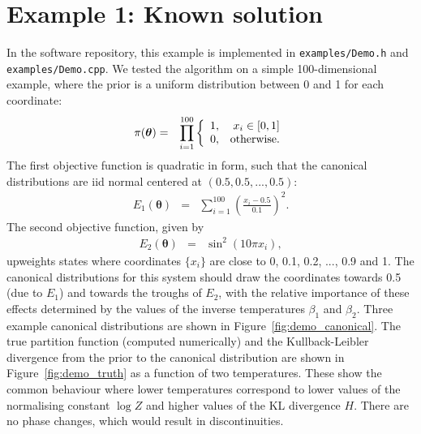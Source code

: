 \documentclass[entropy,article,submit,moreauthors,pdftex,10pt,a4paper]{Definitions/mdpi}
\newcommand{\xx}{\boldsymbol{\theta}}
\begin{document}
\section{Example 1: Known solution}
In the software repository, this example is implemented in
{\tt examples/Demo.h} and {\tt examples/Demo.cpp}.
We tested the algorithm on a simple 100-dimensional example, where the
prior is a uniform distribution between 0 and 1 for each coordinate:
\begin{eqnarray}
\pi(\xx) &=& \prod_{i=1}^{100}
\left\{
\begin{array}{lr}
1, & x_i \in [0, 1]\\
0, & \textnormal{otherwise.}
\end{array}
\right.
\end{eqnarray}
The first objective function is quadratic in form, such that the canonical
distributions are iid normal centered at $(0.5, 0.5, ..., 0.5)$:
\begin{eqnarray}
E_1(\xx) &=& \sum_{i=1}^{100} \left(\frac{x_i - 0.5}{0.1}\right)^2.
\end{eqnarray}
The second objective function, given by
\begin{eqnarray} 
E_2(\xx) &=& \sin^2(10 \pi x_i),
\end{eqnarray}
upweights states where coordinates $\{x_i\}$
are close to 0, 0.1, 0.2, ..., 0.9 and 1.
The canonical distributions for this system should draw the coordinates
towards 0.5 (due to $E_1$) and towards the troughs of $E_2$, with the
relative importance of these effects determined by the values of the
inverse temperatures $\beta_1$ and $\beta_2$. Three example canonical
distributions are shown in Figure~\ref{fig:demo_canonical}.
The true partition function (computed numerically) and the Kullback-Leibler
divergence from the prior to the canonical distribution are shown in
Figure~\ref{fig:demo_truth} as a function of two temperatures. These show the
common behaviour where lower temperatures correspond to lower values
of the normalising constant $\log Z$ and higher values of the KL divergence
$H$. There are no phase changes, which would result in discontinuities.
\end{document}

